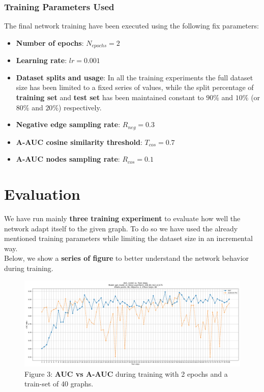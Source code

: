 \documentclass[11pt]{article}
\begin{document}
	\subsubsection{Training Parameters Used}
	The final network training have been executed using the following fix parameters:
	\begin{itemize}
		\item{\textbf{Number of epochs}}: $N_{epochs}=2$
		
		\item{\textbf{Learning rate}}: $lr=0.001$
		
		\item{\textbf{Dataset splits and usage}}: In all the training experiments the full dataset size has been limited to a fixed series of values, while the split percentage of \textbf{training set} and \textbf{test set} has been maintained constant to $90\%$ and $10\%$ (or $80\%$ and $20\%$) respectively.    
				
		\item{\textbf{Negative edge sampling rate}}: $R_{neg}=0.3$
		
		\item{\textbf{A-AUC cosine similarity threshold}}: $T_{cos}=0.7$
		
		\item{\textbf{A-AUC nodes sampling rate}}: $R_{cos}=0.1$
	\end{itemize}
	
	\section{Evaluation}
	We have run mainly \textbf{three training experiment} to evaluate how well the network adapt itself to the given graph. To do so we have used the already mentioned training parameters while limiting the dataset size in an incremental way. \\
	Below, we show a \textbf{series of figure} to better understand the network behavior during training.
	
	\begin{figure}[h!] %
		\centering
		\label{figure_3}
		\includegraphics[width=1\textwidth]{images/train_auc_gat_model_v1_ReLU_LayerNorm_128_64_4x2_d_0.75_40_2_20250202-144005.jpg}
		\caption{Figure 3: \textbf{AUC vs A-AUC} during training with 2 epochs and a train-set of 40 graphs.}
	\end{figure}
	
\end{document}
